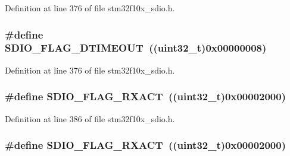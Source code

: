Definition at line 376 of file stm32f10x\+\_\+sdio.\+h.

\subsubsection[{\texorpdfstring{S\+D\+I\+O\+\_\+\+F\+L\+A\+G\+\_\+\+D\+T\+I\+M\+E\+O\+UT}{SDIO_FLAG_DTIMEOUT}}]{\setlength{\rightskip}{0pt plus 5cm}\#define S\+D\+I\+O\+\_\+\+F\+L\+A\+G\+\_\+\+D\+T\+I\+M\+E\+O\+UT~(({\bf uint32\+\_\+t})0x00000008)}\hypertarget{group___s_d_i_o___flags_ga2d2fd219dd9fea522862195ab9568345}{}\label{group___s_d_i_o___flags_ga2d2fd219dd9fea522862195ab9568345}


Definition at line 376 of file stm32f10x\+\_\+sdio.\+h.

\subsubsection[{\texorpdfstring{S\+D\+I\+O\+\_\+\+F\+L\+A\+G\+\_\+\+R\+X\+A\+CT}{SDIO_FLAG_RXACT}}]{\setlength{\rightskip}{0pt plus 5cm}\#define S\+D\+I\+O\+\_\+\+F\+L\+A\+G\+\_\+\+R\+X\+A\+CT~(({\bf uint32\+\_\+t})0x00002000)}\hypertarget{group___s_d_i_o___flags_gacc935dd830338970890a05922dff8ab7}{}\label{group___s_d_i_o___flags_gacc935dd830338970890a05922dff8ab7}


Definition at line 386 of file stm32f10x\+\_\+sdio.\+h.

\subsubsection[{\texorpdfstring{S\+D\+I\+O\+\_\+\+F\+L\+A\+G\+\_\+\+R\+X\+A\+CT}{SDIO_FLAG_RXACT}}]{\setlength{\rightskip}{0pt plus 5cm}\#define S\+D\+I\+O\+\_\+\+F\+L\+A\+G\+\_\+\+R\+X\+A\+CT~(({\bf uint32\+\_\+t})0x00002000)}\hypertarget{group___s_d_i_o___flags_gacc935dd830338970890a05922dff8ab7}{}\label{group___s_d_i_o___flags_gacc935dd830338970890a05922dff8ab7}



